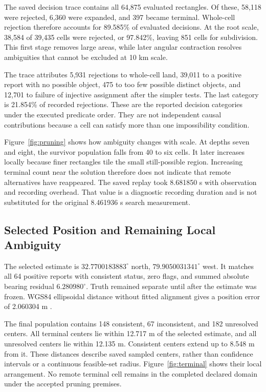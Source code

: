 \documentclass[conference]{IEEEtran}
\begin{document}
The saved decision trace contains all 64,875 evaluated rectangles. Of these, 58,118 were rejected, 6,360 were expanded, and 397 became terminal. Whole-cell rejection therefore accounts for 89.585\% of evaluated decisions. At the root scale, 38,584 of 39,435 cells were rejected, or 97.842\%, leaving 851 cells for subdivision. This first stage removes large areas, while later angular contraction resolves ambiguities that cannot be excluded at 10 km scale.



The trace attributes 5,931 rejections to whole-cell land, 39,011 to a positive report with no possible object, 475 to too few possible distinct objects, and 12,701 to failure of injective assignment after the simpler tests. The last category is 21.854\% of recorded rejections. These are the reported decision categories under the executed predicate order. They are not independent causal contributions because a cell can satisfy more than one impossibility condition.

Figure~\ref{fig:pruning} shows how ambiguity changes with scale. At depths seven and eight, the survivor population falls from 40 to six cells. It later increases locally because finer rectangles tile the small still-possible region. Increasing terminal count near the solution therefore does not indicate that remote alternatives have reappeared. The saved replay took 8.681850 s with observation and recording overhead. That value is a diagnostic recording duration and is not substituted for the original 8.461936 s search measurement.

\subsection{Selected Position and Remaining Local Ambiguity}
The selected estimate is $32.7700183883^\circ$ north, $79.9050031341^\circ$ west. It matches all 64 positive reports with consistent status, zero flags, and summed absolute bearing residual $6.280980^\circ$. Truth remained separate until after the estimate was frozen. WGS84 ellipsoidal distance without fitted alignment gives a position error of 2.060304 m \cite{Vaught2026CharlestonRecord}.



The final population contains 148 consistent, 67 inconsistent, and 182 unresolved centers. All terminal centers lie within 12.717 m of the selected estimate, and all unresolved centers lie within 12.135 m. Consistent centers extend up to 8.548 m from it. These distances describe saved sampled centers, rather than confidence intervals or a continuous feasible-set radius. Figure~\ref{fig:terminal} shows their local arrangement. No remote terminal cell remains in the completed declared domain under the accepted pruning premises.
\end{document}
